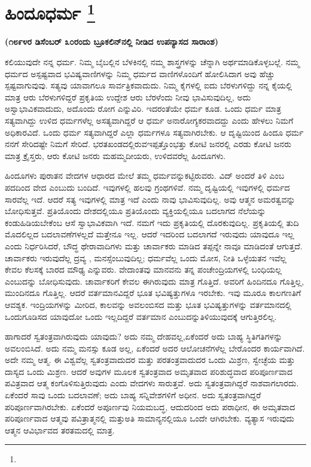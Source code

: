 
\chapter[ಹಿಂದೂಧರ್ಮ ]{ಹಿಂದೂಧರ್ಮ \protect\footnote{}}

\centerline{\textbf{(೧೮೯೪ರ ಡಿಸೆಂಬರ್​ ೩೦ರಂದು ಬ್ರೂಕಲಿನ್​ನಲ್ಲಿ ನೀಡಿದ ಉಪನ್ಯಾಸದ ಸಾರಾಂಶ)}}

ಕಲಿಯುವುದೇ ನನ್ನ ಧರ್ಮ. ನಿಮ್ಮ ಬೈಬಲ್ಲಿನ ಬೆಳಕಿನಲ್ಲಿ ನಮ್ಮ ಶಾಸ್ತ್ರಗಳನ್ನು ಚೆನ್ನಾಗಿ ಅರ್ಥಮಾಡಿಕೊಳ್ಳಬಲ್ಲೆ. ನಮ್ಮ ಧರ್ಮದ ಅಸ್ಪಷ್ಟವಾದ ಭವಿಷ್ಯವಾಣಿಗಳನ್ನು ನಿಮ್ಮ ಧರ್ಮದ ವಾಣಿಗಳೊಂದಿಗೆ ಹೋಲಿಸಿದಾಗ ಅವು ಹೆಚ್ಚು ಸ್ಪಷ್ಟವಾಗುವುವು. ಸತ್ಯವು ಯಾವಾಗಲೂ ಸಾರ್ವತ್ರಿಕವಾದುದು. ನಿಮ್ಮ ಕೈಗಳಲ್ಲಿ ಐದು ಬೆರಳುಗಳಿದ್ದು ನನ್ನ ಕೈಯಲ್ಲಿ ಮಾತ್ರ ಆರು ಬೆರಳುಗಳಿದ್ದರೆ ಪ್ರಕೃತಿಯ ಉದ್ದೇಶ ಆರು ಬೆರಳೆಂದು ನೀವು ಭಾವಿಸುವುದಿಲ್ಲ, ಅದು ಅಸ್ವಾಭಾವಿಕವಾದುದು, ಅದೊಂದು ರೋಗ ಎನ್ನುವಿರಿ. ಇದರಂತೆಯೇ ಧರ್ಮ ಕೂಡ. ಒಂದು ಧರ್ಮ ಮಾತ್ರ ಸತ್ಯವಾಗಿದ್ದು ಉಳಿದ ಧರ್ಮಗಳೆಲ್ಲ ಅಸತ್ಯವಾಗಿದ್ದರೆ ಆ ಧರ್ಮ ಅನಾರೋಗ್ಯಕರವಾದದ್ದು ಎಂದು ಹೇಳಲು ನಿಮಗೆ ಅಧಿಕಾರವಿದೆ. ಒಂದು ಧರ್ಮ ಸತ್ಯವಾಗಿದ್ದರೆ ಎಲ್ಲಾ ಧರ್ಮಗಳೂ ಸತ್ಯವಾಗಿರಬೇಕು. ಆ ದೃಷ್ಟಿಯಿಂದ ಹಿಂದೂ ಧರ್ಮ ನನಗೆ ಸೇರಿದಷ್ಟೇ ನಿಮಗೆ ಸೇರಿದೆ. ಭರತಖಂಡದಲ್ಲಿರುವ\break ಇಪ್ಪತ್ತೊಂಭತ್ತು ಕೋಟಿ ಜನರಲ್ಲಿ ಎರಡು ಕೋಟಿ ಜನರು ಮಾತ್ರ ಕ್ರೈಸ್ತರು, ಆರು ಕೋಟಿ ಜನರು ಮಹಮ್ಮದೀಯರು, ಉಳಿದವರೆಲ್ಲ ಹಿಂದೂಗಳು.

ಹಿಂದೂಗಳು ಪುರಾತನ ವೇದಗಳ ಆಧಾರದ ಮೇಲೆ ತಮ್ಮ ಧರ್ಮವನ್ನು\break ಕಟ್ಟಿರುವರು. ವಿದ್​ ಅಂದರೆ ತಿಳಿ ಎಂಬ ಪದದಿಂದ ವೇದ ಎಂಬುದು ಬಂದಿದೆ. ಇವುಗಳಲ್ಲಿ ಹಲವು ಗ್ರಂಥಗಳಿವೆ. ನಮ್ಮ ದೃಷ್ಟಿಯಲ್ಲಿ ಇವುಗಳಲ್ಲಿ ಧರ್ಮದ ಸಾರವೆಲ್ಲ ಇದೆ. ಆದರೆ ಸತ್ಯ ಇವುಗಳಲ್ಲಿ ಮಾತ್ರ ಇದೆ ಎಂದು ನಾವು ಭಾವಿಸುವುದಿಲ್ಲ. ಅವು ಆತ್ಮನ ಅಮರತ್ವವನ್ನು ಬೋಧಿಸುತ್ತವೆ. ಪ್ರತಿಯೊಂದು ದೇಶದಲ್ಲಿಯೂ ಪ್ರತಿಯೊಂದು ವ್ಯಕ್ತಿಯಲ್ಲಿಯೂ ಬದಲಾಗದ ನೆಲೆಯನ್ನು ಕಂಡುಹಿಡಿಯಬೇಕೆಂಬ ಆಸೆ ಸ್ವಾಭಾವಿಕವಾಗಿ ಇದೆ. ನಮಗೆ ಇದು ಪ್ರಕೃತಿಯಲ್ಲಿ ದೊರಕುವುದಿಲ್ಲ. ಪ್ರಕೃತಿಯಲ್ಲಿ ತುದಿ ಮೊದಲಿಲ್ಲದ ಬದಲಾವಣೆಗಳಲ್ಲದೆ ಮತ್ತೇನೂ ಇಲ್ಲ. ಆದರೆ ಇದರಿಂದ ಬದಲಾಗದೆ ಇರುವುದು ಯಾವುದೂ ಇಲ್ಲ ಎಂದು ನಿರ್ಧರಿಸಿದರೆ, ಬೌದ್ಧ ಥೇರಾವಾದಿಗಳು ಮತ್ತು ಚಾರ್ವಾಕರು ಮಾಡಿದ ತಪ್ಪನ್ನೇ ನಾವೂ ಮಾಡಿದಂತೆ ಆಗುತ್ತದೆ. ಚಾರ್ವಾಕರು ಇರುವುದೆಲ್ಲ ದ್ರವ್ಯ , ಮನಸ್ಸೆಂಬುವುದಿಲ್ಲ; ಧರ್ಮವೆಲ್ಲ ಒಂದು ಮೋಸ, ನೀತಿ ಒಳ್ಳೆಯತನ ಇವೆಲ್ಲ ಕೇವಲ ಕೆಲಸಕ್ಕೆ ಬಾರದ ಮೌಢ್ಯ ಎನ್ನುವರು. ವೇದಾಂತವು ಮಾನವನು ತನ್ನ ಪಂಚೇಂದ್ರಿಯಗಳಲ್ಲಿ ಬಂಧಿಯಲ್ಲ ಎಂಬುದನ್ನು ಬೋಧಿಸುವುದು. ಚಾರ್ವಾಕರಿಗೆ ಕೇವಲ ಈಗಿರುವುದು ಮಾತ್ರ ಗೊತ್ತಿದೆ. ಅವರಿಗೆ ಹಿಂದಿನದೂ ಗೊತ್ತಿಲ್ಲ, ಮುಂದಿನದೂ ಗೊತ್ತಿಲ್ಲ. ಆದರೆ ವರ್ತಮಾನವಿದ್ದರೆ ಭೂತ ಭವಿಷ್ಯತ್ತುಗಳೂ ಇರಬೇಕು. ಇವು ಮೂರೂ ಕಾಲಗಣತಿಗೆ ಆವಶ್ಯಕ. ಇಂದ್ರಿಯಗಳನ್ನು ಮೀರಿದ, ಕಾಲವನ್ನು ಅವಲಂಬಿಸದ ಮತ್ತು ಭೂತ ಭವಿಷ್ಯತ್ತುಗಳನ್ನು ವರ್ತಮಾನದಲ್ಲಿ ಒಂದುಗೂಡಿಸದ ಯಾವುದೋ ಒಂದು ಇಲ್ಲದಿದ್ದರೆ ವರ್ತಮಾನ ಎಂಬುದನ್ನು\break ತಿಳಿಯುವುದಕ್ಕೆ ಆಗುತ್ತಿರಲಿಲ್ಲ.

ಹಾಗಾದರೆ ಸ್ವತಂತ್ರವಾಗಿರುವುದು ಯಾವುದು? ಅದು ನಮ್ಮ ದೇಹವಲ್ಲ,\break ಏಕೆಂದರೆ ಅದು ಬಾಹ್ಯ ಸ್ಥಿತಿಗತಿಗಳನ್ನು ಅವಲಂಬಿಸಿದೆ. ಅದು ನಮ್ಮ ಮನಸ್ಸು ಕೂಡ ಅಲ್ಲ, ಏಕೆಂದರೆ ಅದರ ಆಲೋಚನೆಗಳೆಲ್ಲ ಬೇರೊಂದರ ಕಾರ್ಯವಾಗಿದೆ. ಅದೇ ನಮ್ಮ ಆತ್ಮ. ಈ ವಿಶ್ವವೆಲ್ಲ ಸ್ವತಂತ್ರವಾದುದರ ಮತ್ತು ಪರತಂತ್ರವಾದುದರ ಒಂದು ಮಿಶ್ರಣ, ಸ್ವೇಚ್ಛೆಯ ಮತ್ತು ದಾಸ್ಯದ ಒಂದು ಮಿಶ್ರಣ. ಆದರೆ ಅವುಗಳ ಮೂಲಕ ಸ್ವತಂತ್ರವಾದ ಅಮೃತವಾದ ಪರಿಶುದ್ಧವಾದ ಪರಿಪೂರ್ಣವಾದ ಪವಿತ್ರವಾದ ಆತ್ಮ ಕಂಗೊಳಿಸುತ್ತಿರುವುದು ಎಂದು ವೇದಗಳು ಸಾರುತ್ತವೆ. ಅದು ಸ್ವತಂತ್ರವಾಗಿದ್ದರೆ ನಾಶವಾಗಲಾರದು. ಏಕೆಂದರೆ ಸಾವು ಒಂದು ಬದಲಾವಣೆ; ಅದು ಬಾಹ್ಯ ಸನ್ನಿವೇಶಗಳಿಗೆ ಅಧೀನ. ಅದು ಸ್ವತಂತ್ರವಾಗಿದ್ದರೆ ಪರಿಪೂರ್ಣವಾಗಿರಬೇಕು. ಏಕೆಂದರೆ ಅಪೂರ್ಣವು ನಿಯಮಬದ್ಧ, ಆದುದರಿಂದ ಅದು ಪರಾಧೀನ, ಈ ಅಮೃತವಾದ ಪರಿಪೂರ್ಣವಾದ ಆತ್ಮವು ಪವಿತ್ರಾತ್ಮನಲ್ಲಿ ಮತ್ತು\break ಅತಿ ಸಾಮಾನ್ಯನಲ್ಲಿಯೂ ಒಂದೇ ಆಗಿರಬೇಕು. ವ್ಯತ್ಯಾಸ ಇರುವುದು ಆತ್ಮನ ಆವಿರ್ಭಾವದ ತರತಮದಲ್ಲಿ ಮಾತ್ರ.

